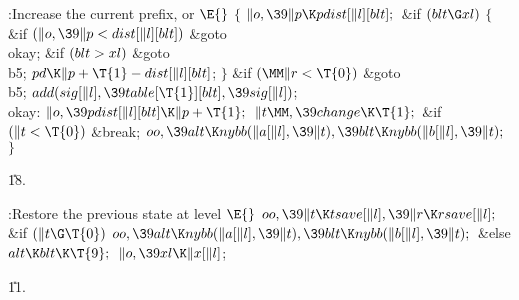 \Y\B\4:Increase the current prefix, or \X${}\E{}$\6
${}\{{}$\1\6
${}\|o,\39\|p\K\\{pdist}[\|l][\\{blt}];{}$\6
\&{if} ${}(\\{blt}\G\\{xl}){}$\5
${}\{{}$\1\6
\&{if} ${}(\|o,\39\|p<\\{dist}[\|l][\\{blt}]){}$\1\5
\&{goto} \\{okay};\2\6
\&{if} ${}(\\{blt}>\\{xl}){}$\1\5
\&{goto} \\{b5};\2\6
${}\\{pd}\K\|p+\T{1}-\\{dist}[\|l][\\{blt}]{}$;\6
\4${}\}{}$\2\6
\&{if} ${}(\MM\|r<\T{0}){}$\1\5
\&{goto} \\{b5};\2\6
${}\\{add}(\\{sig}[\|l],\39\\{table}[\T{1}][\\{blt}],\39\\{sig}[\|l]){}$;\6
\4\\{okay}:\5
${}\|o,\39\\{pdist}[\|l][\\{blt}]\K\|p+\T{1};{}$\6
${}\|t\MM,\39\\{change}\K\T{1};{}$\6
\&{if} ${}(\|t<\T{0}){}$\1\5
\&{break};\2\6
${}\\{oo},\39\\{alt}\K\\{nybb}(\|a[\|l],\39\|t),\39\\{blt}\K\\{nybb}(\|b[\|l],%
\39\|t);{}$\6
\4${}\}{}$\2\par
\U18.\fi

\B{}:Restore the previous state at level \X${}%
\E{}$\6
$\\{oo},\39\|t\K\\{tsave}[\|l],\39\|r\K\\{rsave}[\|l];{}$\6
\&{if} ${}(\|t\G\T{0}){}$\1\5
${}\\{oo},\39\\{alt}\K\\{nybb}(\|a[\|l],\39\|t),\39\\{blt}\K\\{nybb}(\|b[\|l],%
\39\|t);{}$\2\6
\&{else}\1\5
${}\\{alt}\K\\{blt}\K\T{9};{}$\2\6
${}\|o,\39\\{xl}\K\|x[\|l]{}$;\par
\U11.\fi

